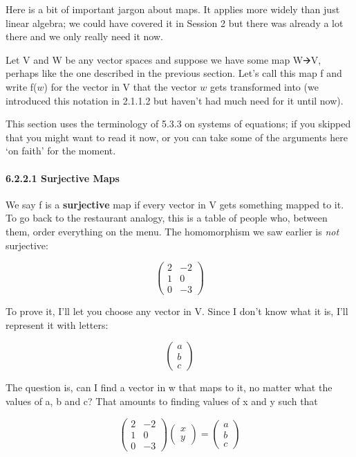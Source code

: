 \documentclass[oneside,english]{amsbook}
\numberwithin{section}{chapter}
\theoremstyle{plain}
\theoremstyle{definition}
\begin{document}
Here is a bit of important jargon about maps. It applies more widely
than just linear algebra; we could have covered it in Session 2 but
there was already a lot there and we only really need it now.

Let V and W be any vector spaces and suppose we have some map W🡪V,
perhaps like the one described in the previous section. Let's call this
map f and write f($w$) for the vector in V that the vector $w$
gets transformed into (we introduced this notation in 2.1.1.2 but
haven't had much need for it until now).

This section uses the terminology of 5.3.3 on systems of equations; if
you skipped that you might want to read it now, or you can take some of
the arguments here `on faith' for the moment.

\paragraph{6.2.2.1 Surjective Maps}\label{surjective-maps}

We say f is a \textbf{surjective} map if every vector in V gets
something mapped to it. To go back to the restaurant analogy, this is a
table of people who, between them, order everything on the menu. The
homomorphism we saw earlier is \emph{not} surjective:

\[\begin{pmatrix}
	2 & - 2 \\
	1 & 0 \\
	0 & - 3
\end{pmatrix}\]

To prove it, I'll let you choose any vector in V. Since I don't know
what it is, I'll represent it with letters:

\[\begin{pmatrix}
	a \\
	b \\
	c
\end{pmatrix}\]

The question is, can I find a vector in w that maps to it, no matter
what the values of a, b and c? That amounts to finding values of x and y
such that

\[\begin{pmatrix}
	2 & - 2 \\
	1 & 0 \\
	0 & - 3
\end{pmatrix}\begin{pmatrix}
	x \\
	y
\end{pmatrix} = \begin{pmatrix}
	a \\
	b \\
	c
\end{pmatrix}\]
\end{document}
